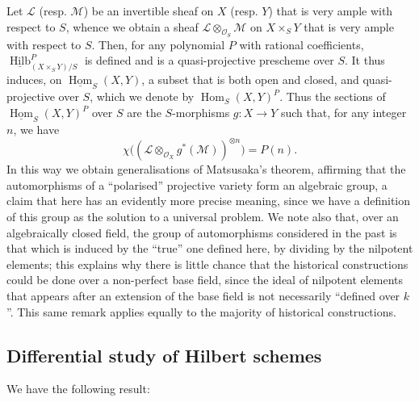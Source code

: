 \documentclass{article}
\newcommand{\oldpage}[1]{\marginpar{\footnotesize$\Big\vert$ \textit{p.~#1}}}
\theoremstyle{definition}
\theoremstyle{definition}
\theoremstyle{definition}
\theoremstyle{definition}
\theoremstyle{remark}
\begin{document}
Let \({\mathscr{L}}\) (resp. \({\mathscr{M}}\)) be an invertible sheaf on \(X\) (resp. \(Y\)) that is very ample with respect to \(S\), whence we obtain a sheaf \({\mathscr{L}}\otimes_{{\mathscr{O}}_S}{\mathscr{M}}\) on \(X\times_S Y\) that is very ample with respect to \(S\).
Then, for any polynomial \(P\) with rational coefficients, \(\underline{\operatorname{Hilb}}_{(X\times_S Y)/S}^P\) is defined and is a quasi-projective prescheme over \(S\).
It thus induces, on \(\underline{\operatorname{Hom}}_S(X,Y)\), a subset that is both open and closed, and quasi-projective over \(S\), which we denote by \(\operatorname{Hom}_S(X,Y)^P\).
Thus the sections of \(\underline{\operatorname{Hom}}_S(X,Y)^P\) over \(S\) are the \(S\)-morphisms \(g\colon X\to Y\) such that, for any integer \(n\), we have
\[
    \chi\Big(({\mathscr{L}}\otimes_{{\mathscr{O}}_X}g^*({\mathscr{M}}))^{\otimes n}\Big)
    = P(n).
  \]
In this way we obtain generalisations of Matsusaka's theorem, affirming that the automorphisms of a ``polarised'' projective variety form an algebraic group, a claim that here has an evidently more precise meaning, since we have a definition of this group as the solution to a universal problem.
We note also that, over an algebraically closed field, the group of automorphisms considered in the past is that which is induced by the ``true'' one defined here, by dividing by the nilpotent elements;
this explains why there is little chance that the historical constructions could be done over a non-perfect base field, since the ideal of nilpotent elements that appears after an extension of the base field is not necessarily ``defined over \(k\)''.
This same remark applies equally to the majority of historical constructions.

\hypertarget{fga-3-iv-section-5}{%
\subsection{Differential study of Hilbert schemes}\label{fga-3-iv-section-5}}

\oldpage{221-21}We have the following result:
\end{document}
